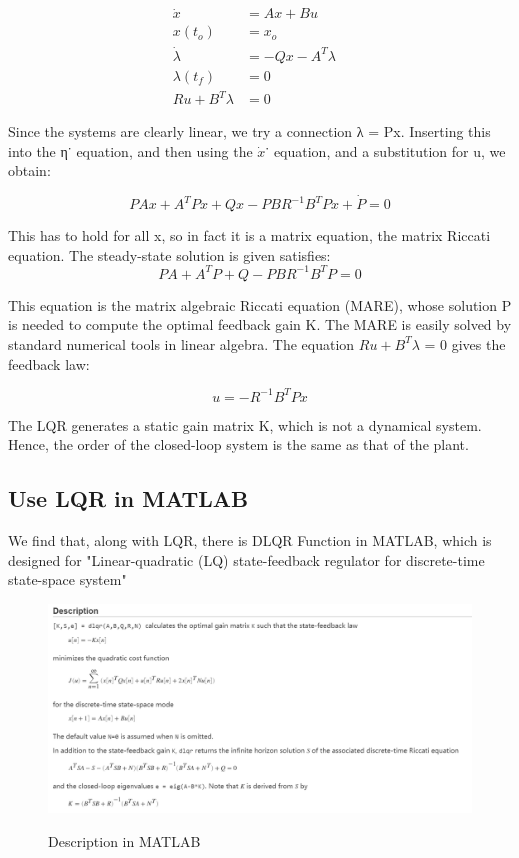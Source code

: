 \documentclass{mcmthesis}
\begin{document}
$$\begin{aligned}
\dot{x} &=A x+B u \\
x\left(t_{o}\right) &=x_{o} \\
\dot{\lambda}&=-Q x-A^{T} \lambda & \\
\lambda\left(t_{f}\right) &=0 \\
R u+B^{T} \lambda &=0
\end{aligned}$$

Since the systems are clearly linear, we try a connection λ = Px. Inserting this into the η˙
equation, and then using the $\dot{x}$˙ equation, and a substitution for u, we obtain:

$$P A x+A^{T} P x+Q x-P B R^{-1} B^{T} P x+\dot{P}=0$$

This has to hold for all x, so in fact it is a matrix equation, the matrix Riccati equation.
The steady-state solution is given satisfies:
$$P A+A^{T} P+Q-P B R^{-1} B^{T} P=0$$

This equation is the matrix algebraic Riccati equation (MARE), whose solution P is needed
to compute the optimal feedback gain K. The MARE is easily solved by standard numerical
tools in linear algebra.
The equation $Ru + B^T \lambda$ = 0 gives the feedback law:

$$u = −R^{−1}B^{T}Px$$

The LQR generates a static gain matrix K, which is not a dynamical system.
Hence, the order of the closed-loop system is the same as that of the plant.

\subsection{Use LQR in MATLAB}

We find that, along with LQR, there is DLQR Function in MATLAB, which is designed for "Linear-quadratic (LQ) state-feedback regulator for discrete-time state-space system" 
\begin{figure}[H]%
  \centering
  \caption{Description in MATLAB}
  \includegraphics[width=\columnwidth]{Optimal Control of a Linear Discrete System/MCM20200128/picture/DLQR.png} %
  \label{Fig.RNN} %
\end{figure}
\end{document}
